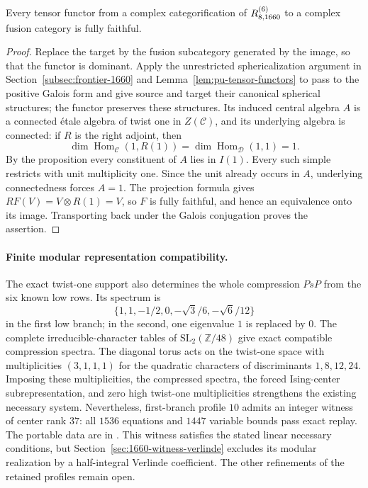 \begin{samepage}
\begin{corollary}\label{cor:1660-twist-one-quotient}
Every tensor functor from a complex categorification of
$R^{(6)}_{8,1660}$ to a complex fusion category is fully faithful.
\end{corollary}
\begin{proof}
Replace the target by the fusion subcategory generated by the image,
so that the functor is dominant. Apply the unrestricted sphericalization
argument in Section~\ref{subsec:frontier-1660} and
Lemma~\ref{lem:pu-tensor-functors} to pass to the positive Galois form
and give source and target their canonical spherical structures; the
functor preserves these structures. Its induced central algebra $A$ is a connected
\'etale algebra of twist one in $Z(\mathcal C)$, and its underlying
algebra is connected: if $R$ is the right adjoint, then
\[
 \dim\operatorname{Hom}_{\mathcal C}(1,R(1))
 =\dim\operatorname{Hom}_{\mathcal D}(1,1)=1.
\]
By the proposition every constituent of $A$ lies in $I(1)$.
Every such simple restricts with unit multiplicity one. Since the
unit already occurs in $A$, underlying connectedness forces $A=1$.
The projection formula gives $RF(V)=V\otimes R(1)=V$, so $F$ is
fully faithful, and hence an equivalence onto its image. Transporting
back under the Galois conjugation proves the assertion.
\end{proof}
\end{samepage}

\paragraph{Finite modular representation compatibility.}
The exact twist-one support also determines the whole compression
$PsP$ from the six known low rows.  Its spectrum is
\[
 \{1,1,-1/2,0,-\sqrt3/6,-\sqrt6/12\}
\]
in the first low branch; in the second, one eigenvalue $1$ is replaced
by $0$.  The complete irreducible-character tables of
$\mathrm{SL}_2(\mathbb Z/48)$ give exact compatible compression
spectra.  The diagonal torus acts on the twist-one space with
multiplicities $(3,1,1,1)$ for the quadratic characters of
discriminants $1,8,12,24$.  Imposing these multiplicities, the
compressed spectra, the forced Ising-center subrepresentation, and
zero high twist-one multiplicities strengthens the existing
necessary system.  Nevertheless, first-branch profile $10$ admits
an integer witness of center rank $37$: all $1536$ equations and
$1447$ variable bounds pass exact replay.  The portable data are in
.
This witness satisfies the stated linear necessary conditions, but
Section~\ref{sec:1660-witness-verlinde} excludes its modular realization
by a half-integral Verlinde coefficient. The other refinements of the
retained profiles remain open.


